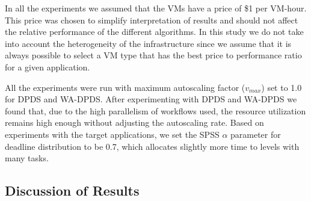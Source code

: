 \documentclass[conference]{IEEEtran}
\begin{document}
In all the experiments we assumed that the VMs have a price of \$1 per VM-hour. This price was chosen to simplify interpretation of results and should not affect the relative performance of the different algorithms. In this study we do not take into account the heterogeneity of the infrastructure since we assume that it is always possible to select a VM type that has the best price to performance ratio for a given application.

All the experiments were run with maximum autoscaling factor ($v_{max}$) set to 1.0 for DPDS and WA-DPDS. After experimenting with DPDS and WA-DPDS we found that, due to the high parallelism of workflows used, the resource utilization remains high enough without adjusting the autoscaling rate. Based on experiments with the target applications, we set the SPSS $\alpha$ parameter for deadline distribution to be 0.7, which allocates slightly more time to levels with many tasks.

\subsection{Discussion of Results}

\end{document}

